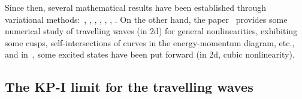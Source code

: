 \documentclass[AHL,Unicode,longabstracts,published]{cedram}
\begin{document}
Since then, several mathematical results have been established through variational methods:~\cite[(2d)]{BS99}, \cite[(3d and higher)]{BetOrlSme}, \cite[(3d and higher)]{Cvortexring}, \cite[(2d and 3d)]{BGS2}, \cite{M_exist}, \cite[(2d and higher)]{CM1}, \cite[(2d and 3d)]{Bel_Rui}. On the other hand, the paper~\cite{ChiSch15} provides some numerical study of travelling waves (in 2d) for general nonlinearities, exhibiting some cusps, self-intersections of curves in the energy-momentum diagram, etc., and in~\cite{ChiSch_Morse}, some excited states have been put forward (in 2d, cubic nonlinearity).



\subsection{The KP-I limit for the travelling waves}
\end{document}
